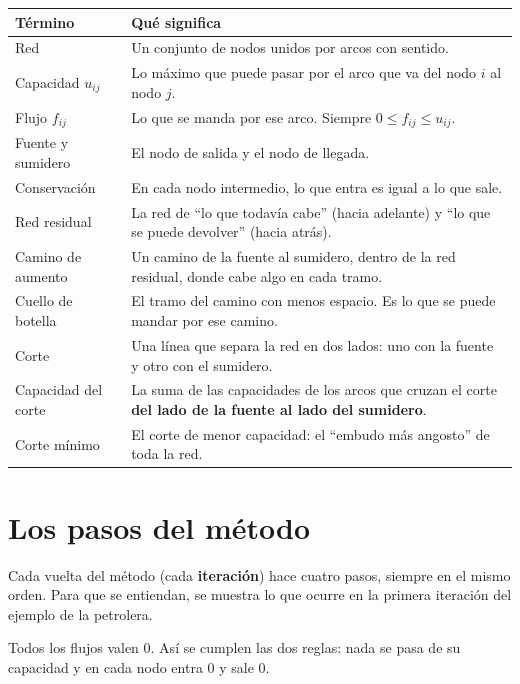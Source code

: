 \documentclass[11pt,a4paper]{article}
\begin{document}
\begin{center}\small
\begin{tabular}{p{3.4cm}p{10.8cm}}
\toprule
\textbf{Término} & \textbf{Qué significa} \\
\midrule
Red & Un conjunto de nodos unidos por arcos con sentido. \\
Capacidad $u_{ij}$ & Lo máximo que puede pasar por el arco que va del nodo $i$ al nodo $j$. \\
Flujo $f_{ij}$ & Lo que se manda por ese arco. Siempre $0 \le f_{ij} \le u_{ij}$. \\
Fuente y sumidero & El nodo de salida y el nodo de llegada. \\
Conservación & En cada nodo intermedio, lo que entra es igual a lo que sale. \\
Red residual & La red de ``lo que todavía cabe'' (hacia adelante) y ``lo que se puede devolver'' (hacia atrás). \\
Camino de aumento & Un camino de la fuente al sumidero, dentro de la red residual, donde cabe algo en cada tramo. \\
Cuello de botella & El tramo del camino con menos espacio. Es lo que se puede mandar por ese camino. \\
Corte & Una línea que separa la red en dos lados: uno con la fuente y otro con el sumidero. \\
Capacidad del corte & La suma de las capacidades de los arcos que cruzan el corte \textbf{del lado de la fuente al lado del sumidero}. \\
Corte mínimo & El corte de menor capacidad: el ``embudo más angosto'' de toda la red. \\
\bottomrule
\end{tabular}
\end{center}

\section{Los pasos del método}\label{sec:algoritmo}

Cada vuelta del método (cada \textbf{iteración}) hace cuatro pasos, siempre en el mismo orden. Para que se
entiendan, se muestra lo que ocurre en la primera iteración del ejemplo de la petrolera.

Todos los flujos valen 0. Así se cumplen las dos reglas: nada se pasa de su capacidad y en cada nodo entra 0 y sale 0.
\end{document}
